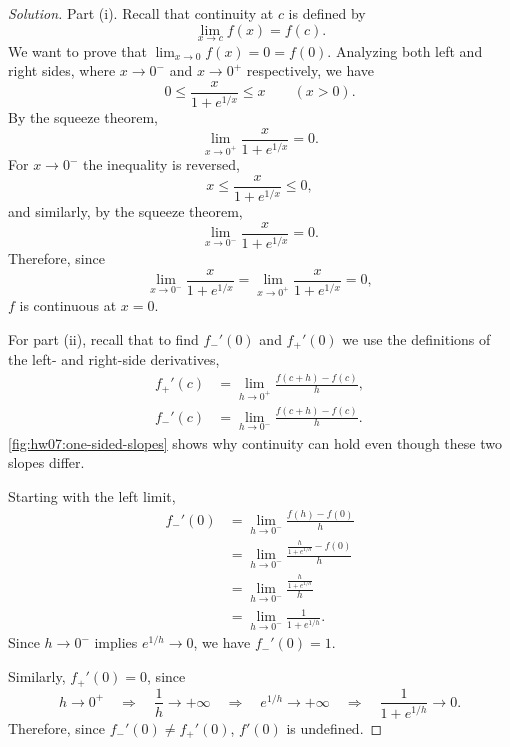 \begin{proof}[Solution]
  Part (i). Recall that continuity at $c$ is defined by
  \[
    \lim_{x\to c}f(x)=f(c).
  \]
  We want to prove that $\lim_{x\to0}f(x)=0=f(0)$. Analyzing both
  left and right sides, where $x\to0^-$ and $x\to0^+$ respectively,
  we have
  \[
    0\le\frac{x}{1+e^{1/x}}\le x
    \qquad(x>0).
  \]
  By the squeeze theorem,
  \[
    \lim_{x\to0^+}\frac{x}{1+e^{1/x}}=0.
  \]
  For $x\to0^-$ the inequality is reversed,
  \[
    x\le\frac{x}{1+e^{1/x}}\le0,
  \]
  and similarly, by the squeeze theorem,
  \[
    \lim_{x\to0^-}\frac{x}{1+e^{1/x}}=0.
  \]
  Therefore, since
  \[
    \lim_{x\to0^-}\frac{x}{1+e^{1/x}}
      =\lim_{x\to0^+}\frac{x}{1+e^{1/x}}=0,
  \]
  $f$ is continuous at $x=0$.

  For part (ii), recall that to find $f_-'(0)$ and $f_+'(0)$ we
  use the definitions of the left- and right-side derivatives,
  \[
    \begin{aligned}
      f_+'(c)&=\lim_{h\to0^+}\frac{f(c+h)-f(c)}{h},\\
      f_-'(c)&=\lim_{h\to0^-}\frac{f(c+h)-f(c)}{h}.
    \end{aligned}
  \]
  \autoref{fig:hw07:one-sided-slopes} shows why
  continuity can hold even though these two slopes differ.
  \begin{marginfigure}
    \centering
    
    \caption[Continuity with unequal one-sided slopes.]{%
      The graph meets the origin continuously. Its left tangent is
      $y=x$, while its right tangent is $y=0$. The two limiting
      slopes are $1$ and $0$.}
    \label{fig:hw07:one-sided-slopes}
  \end{marginfigure}
  Starting with the left limit,
  \[
    \begin{aligned}
      f_-'(0)
        &=\lim_{h\to0^-}\frac{f(h)-f(0)}{h}\\
        &=\lim_{h\to0^-}
          \frac{\frac{h}{1+e^{1/h}}-f(0)}{h}\\
        &=\lim_{h\to0^-}\frac{\frac{h}{1+e^{1/h}}}{h}\\
        &=\lim_{h\to0^-}\frac1{1+e^{1/h}}.
    \end{aligned}
  \]
  Since $h\to0^-$ implies $e^{1/h}\to0$, we have $f_-'(0)=1$.

  Similarly, $f_+'(0)=0$, since
  \[
    h\to0^+
      \quad\Longrightarrow\quad \frac1h\to+\infty
      \quad\Longrightarrow\quad e^{1/h}\to+\infty
      \quad\Longrightarrow\quad \frac1{1+e^{1/h}}\to0.
  \]
  Therefore, since $f_-'(0)\ne f_+'(0)$, $f'(0)$ is undefined.
\end{proof}
